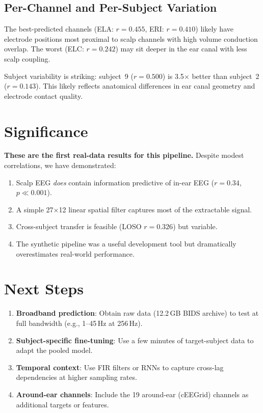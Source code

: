 \documentclass[11pt,a4paper]{article}
\begin{document}
\subsection{Per-Channel and Per-Subject Variation}

The best-predicted channels (ELA: $r=0.455$, ERI: $r=0.410$) likely have
electrode positions most proximal to scalp channels with high volume
conduction overlap. The worst (ELC: $r=0.242$) may sit deeper in the ear
canal with less scalp coupling.

Subject variability is striking: subject~9 ($r=0.500$) is 3.5$\times$
better than subject~2 ($r=0.143$). This likely reflects anatomical
differences in ear canal geometry and electrode contact quality.

\section{Significance}

\textbf{These are the first real-data results for this pipeline.} Despite
modest correlations, we have demonstrated:
\begin{enumerate}
  \item Scalp EEG \emph{does} contain information predictive of in-ear EEG
    ($r=0.34$, $p \ll 0.001$).
  \item A simple 27$\times$12 linear spatial filter captures most of the
    extractable signal.
  \item Cross-subject transfer is feasible (LOSO $r=0.326$) but variable.
  \item The synthetic pipeline was a useful development tool but
    dramatically overestimates real-world performance.
\end{enumerate}

\section{Next Steps}

\begin{enumerate}
  \item \textbf{Broadband prediction}: Obtain raw data (12.2\,GB BIDS archive)
    to test at full bandwidth (e.g., 1--45\,Hz at 256\,Hz).
  \item \textbf{Subject-specific fine-tuning}: Use a few minutes of
    target-subject data to adapt the pooled model.
  \item \textbf{Temporal context}: Use FIR filters or RNNs to capture
    cross-lag dependencies at higher sampling rates.
  \item \textbf{Around-ear channels}: Include the 19 around-ear (cEEGrid)
    channels as additional targets or features.
\end{enumerate}
\end{document}
